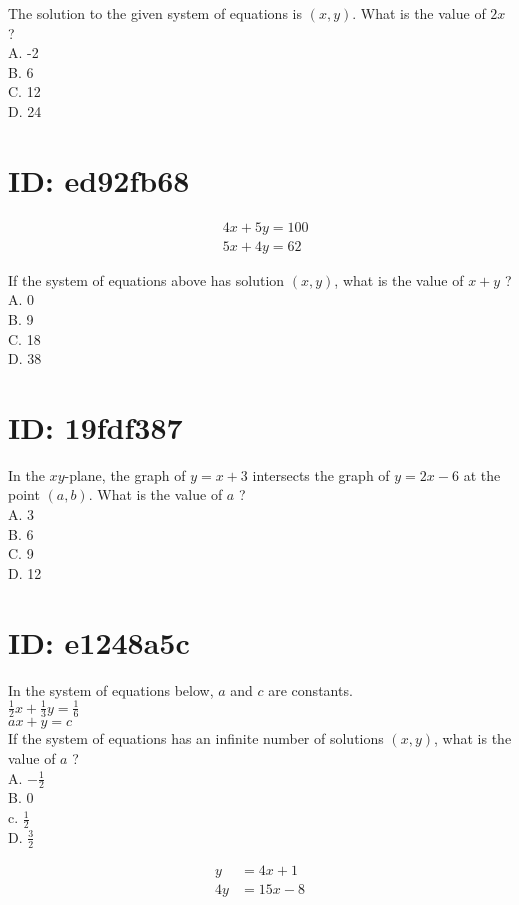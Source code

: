 The solution to the given system of equations is $(x, y)$. What is the value of $2 x$ ?\\
A. -2\\
B. 6\\
C. 12\\
D. 24

\section*{ID: ed92fb68}
$$
\begin{aligned}
& 4 x+5 y=100 \\
& 5 x+4 y=62
\end{aligned}
$$

If the system of equations above has solution $(x, y)$, what is the value of $x+y$ ?\\
A. 0\\
B. 9\\
C. 18\\
D. 38

\section*{ID: 19fdf387}
In the $x y$-plane, the graph of $y=x+3$ intersects the graph of $y=2 x-6$ at the point $(a, b)$. What is the value of $a$ ?\\
A. 3\\
B. 6\\
C. 9\\
D. 12

\section*{ID: e1248a5c}
In the system of equations below, $a$ and $c$ are constants.\\
$\frac{1}{2} x+\frac{1}{3} y=\frac{1}{6}$\\
$a x+y=c$\\
If the system of equations has an infinite number of solutions $(x, y)$, what is the value of $a$ ?\\
A. $-\frac{1}{2}$\\
B. 0\\
c. $\frac{1}{2}$\\
D. $\frac{3}{2}$

$$
\begin{aligned}
y & =4 x+1 \\
4 y & =15 x-8
\end{aligned}
$$

